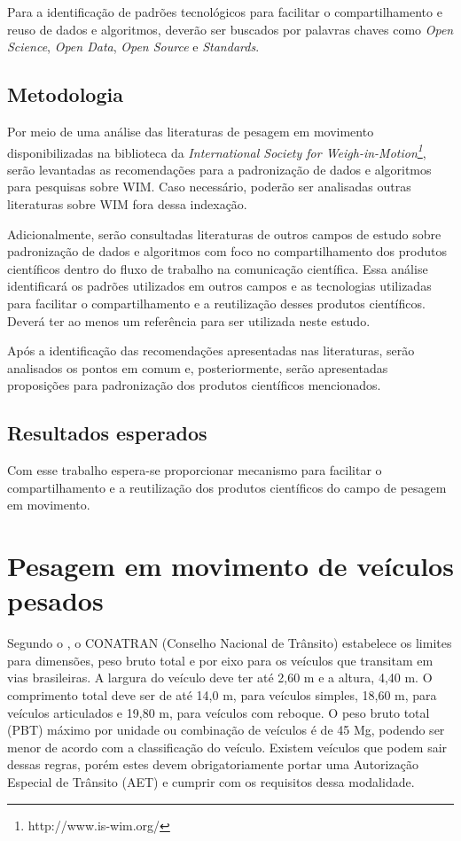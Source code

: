\documentclass{ufscThesis}
\begin{document}
Para a identificação de padrões tecnológicos para facilitar o compartilhamento e reuso de dados e algoritmos, deverão ser buscados por palavras chaves como \textit{Open Science}, \textit{Open Data}, \textit{Open Source} e \textit{Standards}.

\section{Metodologia}\label{introducao-metodologia}
Por meio de uma análise das literaturas de pesagem em movimento disponibilizadas na biblioteca da \textit{International Society for Weigh-in-Motion\footnote{http://www.is-wim.org/}}, serão levantadas as recomendações para a padronização de dados e algoritmos para pesquisas sobre WIM. Caso necessário, poderão ser analisadas outras literaturas sobre WIM fora dessa indexação.

Adicionalmente, serão consultadas literaturas de outros campos de estudo sobre padronização de dados e algoritmos com foco no compartilhamento dos produtos científicos dentro do fluxo de trabalho na comunicação científica. Essa análise identificará os padrões utilizados em outros campos e as tecnologias utilizadas para facilitar o compartilhamento e a reutilização desses produtos científicos. Deverá ter ao menos um referência para ser utilizada neste estudo.

Após a identificação das recomendações apresentadas nas literaturas, serão analisados os pontos em comum e, posteriormente, serão apresentadas proposições para padronização dos produtos científicos mencionados.

\section{Resultados esperados}\label{introducao-resultados}
Com esse trabalho espera-se proporcionar mecanismo para facilitar o compartilhamento e a reutilização dos produtos científicos do campo de pesagem em movimento.


\chapter{Pesagem em movimento de veículos pesados}\label{wim}

Segundo o , o CONATRAN (Conselho Nacional de Trânsito) estabelece os limites para dimensões, peso bruto total e por eixo para os veículos que transitam em vias brasileiras. A largura do veículo deve ter até 2,60 m e a altura, 4,40 m. O comprimento total deve ser de até 14,0 m, para veículos simples, 18,60 m, para veículos articulados e 19,80 m, para veículos com reboque. O peso bruto total (PBT) máximo por unidade ou combinação de veículos é de 45 Mg, podendo ser menor de acordo com a classificação do veículo. Existem veículos que podem sair dessas regras, porém estes devem obrigatoriamente portar uma Autorização Especial de Trânsito (AET) e cumprir com os requisitos dessa modalidade.
\end{document}
